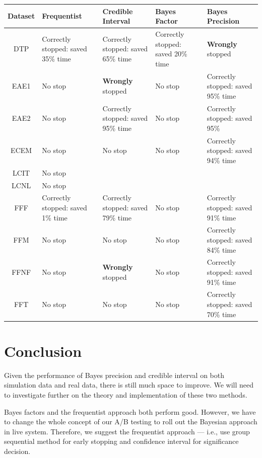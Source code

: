 \documentclass[paper=a4, fontsize=11pt]{scrartcl} %
\numberwithin{equation}{section} %
\numberwithin{figure}{section} %
\numberwithin{table}{section} %
\begin{document}
\begin{center}
  \begin{tabular}{ | c | p{30mm} | p{30mm} | p{30mm} | p{30mm} |}
    \hline
     Dataset & Frequentist  & Credible Interval & Bayes Factor & Bayes Precision \\ \hline\hline
     DTP & Correctly stopped: saved 35\% time & Correctly stopped: saved 65\% time & Correctly stopped: saved 20\% time & \textbf{Wrongly} stopped \\ \hline
     EAE1 & No stop & \textbf{Wrongly} stopped & No stop & Correctly stopped: saved 95\% time \\ \hline
     EAE2 & No stop & Correctly stopped: saved 95\% time & No stop & Correctly stopped: saved 95\% \\ \hline
     ECEM & No stop & No stop & No stop & Correctly stopped: saved 94\% time \\ \hline
     LCIT & No stop & & & \\ \hline
     LCNL & No stop & & & \\ \hline
     FFF & Correctly stopped: saved 1\% time & Correctly stopped: saved 79\% time & No stop & Correctly stopped: saved 91\% time \\ \hline
     FFM & No stop & No stop & No stop & Correctly stopped: saved 84\% time \\ \hline
     FFNF & No stop & \textbf{Wrongly} stopped & No stop & Correctly stopped: saved 91\% time\\ \hline
     FFT & No stop & No stop & No stop & Correctly stopped: saved 70\% time \\ \hline
  \end{tabular}
\label{table:final}
\end{center}


\section{Conclusion}
Given the performance of Bayes precision and credible interval on both simulation data and real data, there is still much space to improve. We will need to investigate further on the theory and implementation of these two methods.

Bayes factors and the frequentist approach both perform good. However, we have to change the whole concept of our A/B testing to roll out the Bayesian approach in live system. Therefore, we suggest the frequentist approach --- i.e., use group sequential method for early stopping and confidence interval for significance decision.

\end{document}
